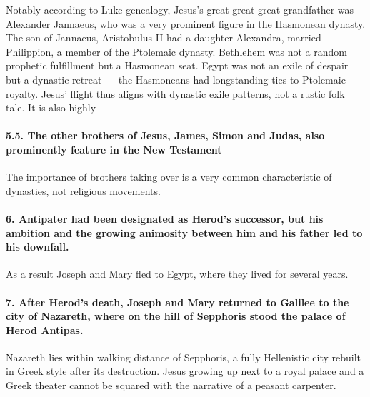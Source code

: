 Notably according to Luke genealogy, Jesus's great-great-great grandfather was Alexander Jannaeus, who was a very prominent figure in the Hasmonean dynasty.
The son of Jannaeus, Aristobulus II had a daughter Alexandra, married Philippion, a member of the Ptolemaic dynasty.
Bethlehem was not a random prophetic fulfillment but a Hasmonean seat. Egypt was not an exile of despair but a dynastic retreat — the Hasmoneans had longstanding ties to Ptolemaic royalty. Jesus’ flight thus aligns with dynastic exile patterns, not a rustic folk tale.
It is also highly

\paragraph{5.5.
The other brothers of Jesus, James, Simon and Judas, also prominently feature in the New Testament}\label{par:the-other-brothers-of-jesus-james-simon-and-judas-also-prominently-feature-in-the-new-testament}

The importance of brothers taking over is a very common characteristic of dynasties, not religious movements.

\paragraph{6.
Antipater had been designated as Herod's successor, but his ambition and the growing animosity between him and his father led to his downfall.}\label{par:antipater-had-been-designated-as-herods-successor-but-his-ambition-and-the-growing-animosity-between-him-and-his-father-led-to-his-downfall.}

As a result Joseph and Mary fled to Egypt, where they lived for several years.

\paragraph{7.
After Herod's death, Joseph and Mary returned to Galilee to the city of Nazareth, where on the hill of Sepphoris stood the palace of Herod Antipas.}\label{par:after-herods-death-joseph-and-mary-returned-to-galilee-to-the-city-of-nazareth-where-on-the-hill-of-sepphoris-stood-the-palace-of-herod-antipas.}

Nazareth lies within walking distance of Sepphoris, a fully Hellenistic city rebuilt in Greek style after its destruction.
Jesus growing up next to a royal palace and a Greek theater cannot be squared with the narrative of a peasant carpenter.

